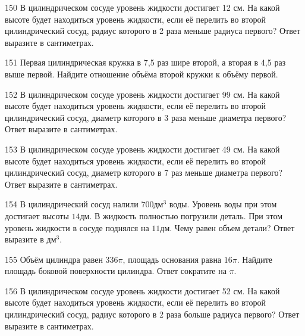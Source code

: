 \documentclass[4apaper]{article}
\begin{document}
\begin{taskBN}{150}
В цилиндрическом сосуде уровень жидкости достигает 12 см. На какой высоте будет находиться уровень жидкости, если её перелить во второй цилиндрический сосуд, радиус которого в 2 раза меньше радиуса первого? Ответ выразите в сантиметрах.
\end{taskBN}

\begin{taskBN}{151}
 Первая цилиндрическая кружка в 7,5 раз шире второй, а вторая в 4,5 раз выше первой. Найдите отношение объёма второй кружки к объёму первой.
\end{taskBN}

\begin{taskBN}{152}
В цилиндрическом сосуде уровень жидкости достигает 99 см. На какой высоте будет находиться уровень жидкости, если её перелить во второй цилиндрический сосуд, диаметр которого в 3 раза меньше диаметра первого? Ответ выразите в сантиметрах.
\end{taskBN}

\begin{taskBN}{153}
В цилиндрическом сосуде уровень жидкости достигает 49 см. На какой высоте будет находиться уровень жидкости, если её перелить во второй цилиндрический сосуд, диаметр которого в 7 раз меньше диаметра первого? Ответ выразите в сантиметрах.
\end{taskBN}

\begin{taskBN}{154}
В цилиндрический сосуд налили $700\mbox{дм}^3$ воды. Уровень воды при этом достигает высоты $14$дм. В жидкость полностью погрузили деталь. При этом уровень жидкости в сосуде поднялся на $11$дм. Чему равен объем детали? Ответ выразите в $\mbox{дм}^3$.
\end{taskBN}

\begin{taskBN}{155}
Объём цилиндра равен $336\pi$, площадь основания равна $16\pi$. Найдите площадь боковой поверхности цилиндра. Ответ сократите на $\pi$.
\end{taskBN}

\begin{taskBN}{156}
В цилиндрическом сосуде уровень жидкости достигает 52 см. На какой высоте будет находиться уровень жидкости, если её перелить во второй цилиндрический сосуд, радиус которого в 2 раза больше радиуса первого? Ответ выразите в сантиметрах.
\end{taskBN}
\end{document}

